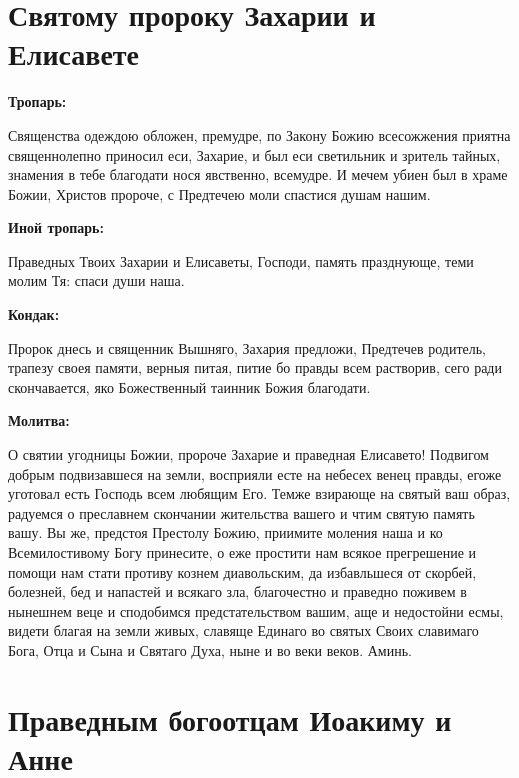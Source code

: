 
 

\section{Святому пророку Захарии и Елисавете}
 
\bfseries Тропарь:\normalfont{}


Священства одеждою обложен, премудре, по Закону Божию всесожжения приятна священнолепно приносил еси, Захарие, и был еси светильник и зритель тайных, знамения в тебе благодати нося явственно, всемудре. И мечем убиен был в храме Божии, Христов пророче, с Предтечею моли спастися душам нашим.


\medskip
\bfseries Иной тропарь:\normalfont{}


Праведных Твоих Захарии и Елисаветы, Господи, память празднующе, теми молим Тя: спаси души наша.


\medskip
\bfseries Кондак:\normalfont{}


Пророк днесь и священник Вышняго, Захария предложи, Предтечев родитель, трапезу своея памяти, верныя питая, питие бо правды всем растворив, сего ради скончавается, яко Божественный таинник Божия благодати.


\medskip
\bfseries Молитва:\normalfont{}


О святии угодницы Божии, пророче Захарие и праведная Елисавето! Подвигом добрым подвизавшеся на земли, восприяли есте на небесех венец правды, егоже уготовал есть Господь всем любящим Его. Темже взирающе на святый ваш образ, радуемся о преславнем скончании жительства вашего и чтим святую память вашу. Вы же, предстоя Престолу Божию, приимите моления наша и ко Всемилостивому Богу принесите, о еже простити нам всякое прегрешение и помощи нам стати противу кознем диавольским, да избавльшеся от скорбей, болезней, бед и напастей и всякаго зла, благочестно и праведно поживем в нынешнем веце и сподобимся предстательством вашим, аще и недостойни есмы, видети благая на земли живых, славяще Единаго во святых Своих славимаго Бога, Отца и Сына и Святаго Духа, ныне и во веки веков. Аминь.

\section{Праведным богоотцам Иоакиму и Анне}
 
